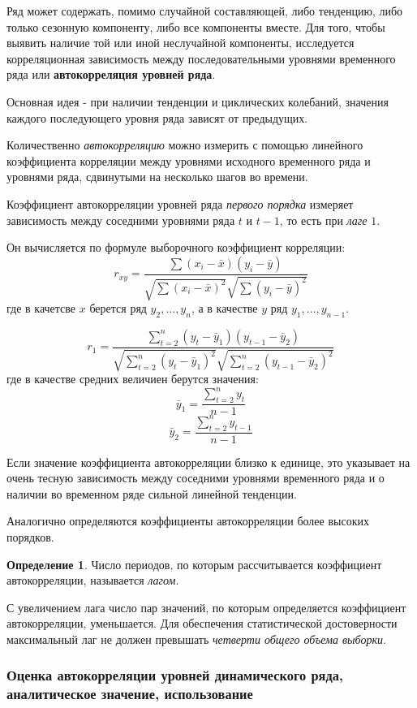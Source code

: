 \documentclass[aps,%
12pt,%
final,%
oneside,
onecolumn,%
musixtex, %
superscriptaddress,%
centertags]{article} %
\theoremstyle{plain}
\theoremstyle{definition}
\newtheorem{definition}{Определение}[subsection]
\theoremstyle{remark}
\begin{document}
Ряд может содержать, помимо случайной составляющей, либо тенденцию, либо только сезонную компоненту, либо все компоненты вместе. Для того, чтобы выявить наличие той или иной неслучайной компоненты, исследуется корреляционная зависимость между последовательными уровнями временного ряда или \textbf{автокорреляция уровней ряда}.

Основная идея - при наличии тенденции и циклических колебаний, значения каждого последующего уровня ряда зависят от предыдущих.

Количественно \textit{автокорреляцию} можно измерить с помощью линейного коэффициента корреляции между уровнями исходного временного ряда и уровнями ряда, сдвинутыми на несколько шагов во времени.

Коэффициент автокорреляции уровней ряда \textit{первого порядка} измеряет зависимость между соседними уровнями ряда $t$ и $t-1$, то есть при \textit{лаге} $1$.

Он вычисляется по формуле выборочного коэффициент корреляции:
$$r_{xy} = \frac{\sum(x_i-\bar{x})(y_i - \bar{y})}{\sqrt{\sum(x_i - \bar{x})^2}\sqrt{\sum(y_i - \bar{y})^2}}$$
где в качетсве $x$ берется ряд $y_2,\ldots,y_n$, а в качестве $y$ ряд $y_1,\ldots,y_{n-1}$.

$$r_1 = \frac{\sum\limits_{t=2}^n (y_t - \bar{y}_1)(y_{t-1}-\bar{y}_2)}{\sqrt{\sum\limits_{t=2}^n (y_t - \bar{y}_1)^2 }\sqrt{\sum\limits_{t=2}^n (y_{t-1} - \bar{y}_2)^2 }}$$
где в качестве средних величиен берутся значения:
$$\bar{y}_1 = \frac{\sum\limits_{t=2}^n y_t}{n-1}$$
$$\bar{y}_2 = \frac{\sum\limits_{t=2}^n y_{t-1}}{n-1}$$

Если значение коэффициента автокорреляции близко к единице, это указывает на очень тесную зависимость между соседними уровнями временного ряда и о наличии во временном ряде сильной линейной тенденции.

Аналогично определяются коэффициенты автокорреляции более высоких порядков.

\begin{definition}
	Число периодов, по которым рассчитывается коэффициент автокорреляции, называется \textit{лагом}.
\end{definition}

С увеличением лага число пар значений, по которым определяется коэффициент автокорреляции, уменьшается. Для обеспечения статистической достоверности максимальный лаг не должен превышать \textit{четверти общего объема выборки}.

\subsubsection{Оценка автокорреляции уровней динамического ряда, аналитическое значение, использование}
\end{document}
